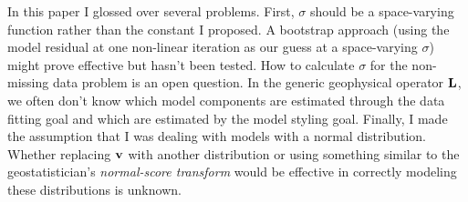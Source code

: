 In this paper I glossed over several problems.
First, $\sigma$ should be a space-varying function rather than
the constant I proposed. A bootstrap approach (using
the model residual at one non-linear iteration as our guess
at a space-varying $\sigma$) might prove effective but hasn't been
tested.  How to calculate $\sigma$ for the non-missing data problem
is an open question. In the generic geophysical operator $\bf L$, we often
don't know
which model components are estimated through the data fitting
goal and which are estimated by the model styling goal.
Finally, I made the  assumption that I was dealing with
models with  a normal distribution. 
Whether replacing $\bf v$ with another distribution
or using something similar to the geostatistician's {\it normal-score transform}
would be effective in correctly modeling these distributions is unknown.
